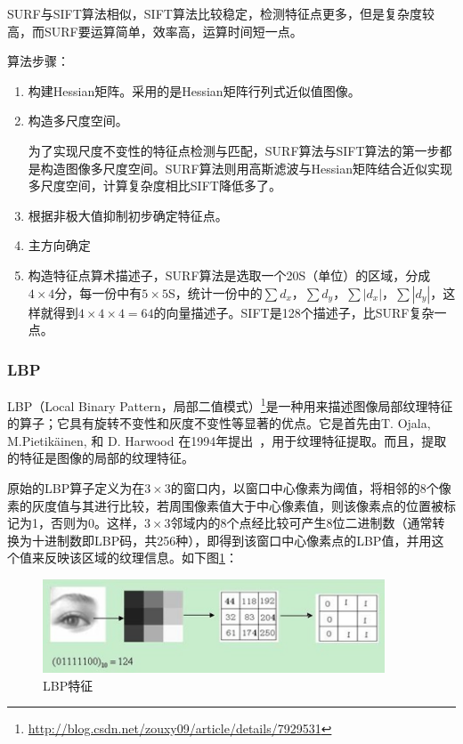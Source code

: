 \documentclass[12pt]{article}
\begin{document}
SURF与SIFT算法相似，SIFT算法比较稳定，检测特征点更多，但是复杂度较高，而SURF要运算简单，效率高，运算时间短一点。

{\color{blue}算法步骤}：

\begin{enumerate}
\item 构建Hessian矩阵。采用的是Hessian矩阵行列式近似值图像。

\item 构造多尺度空间。

为了实现尺度不变性的特征点检测与匹配，SURF算法与SIFT算法的第一步都是构造图像多尺度空间。SURF算法则用高斯滤波与Hessian矩阵结合近似实现多尺度空间，计算复杂度相比SIFT降低多了。

\item 根据非极大值抑制初步确定特征点。

\item 主方向确定

\item 构造特征点算术描述子，SURF算法是选取一个20S（单位）的区域，分成$4 \times 4$分，每一份中有$5 \times 5$S，统计一份中的$\sum d_{x}$，$\sum d_{y}$，$\sum |d_{x}|$，$\sum |d_{y}|$，这样就得到$4 \times 4 \times 4 = 64$的向量描述子。SIFT是128个描述子，比SURF复杂一点。
\end{enumerate}

\subsubsection{LBP}

LBP（Local Binary Pattern，局部二值模式）\footnote{\url{http://blog.csdn.net/zouxy09/article/details/7929531}}是一种用来描述图像局部纹理特征的算子；它具有旋转不变性和灰度不变性等显著的优点。它是首先由T. Ojala, M.Pietikäinen, 和 D. Harwood 在1994年提出~\cite{ojala1994performance}，用于纹理特征提取。而且，提取的特征是图像的局部的纹理特征。
 
 原始的LBP算子定义为在$3\times3$的窗口内，以窗口中心像素为阈值，将相邻的8个像素的灰度值与其进行比较，若周围像素值大于中心像素值，则该像素点的位置被标记为1，否则为0。这样，$3\times3$邻域内的8个点经比较可产生8位二进制数（通常转换为十进制数即LBP码，共256种），即得到该窗口中心像素点的LBP值，并用这个值来反映该区域的纹理信息。如下图\ref{fig:lbp}：
    \begin{figure}[!ht]
    \centering
    \includegraphics[width=4in]{LBP}
    \caption{LBP特征}
    \label{fig:lbp}
    \end{figure}
   
\end{document}

